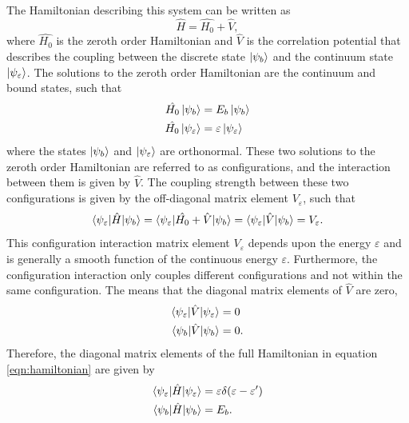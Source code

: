 The Hamiltonian describing this system can  be written as
\begin{equation}
\label{eqn:hamiltonian}
	\hat{H} = \hat{H_0} + \hat{V},
\end{equation}
where $\hat{H_0}$ is the zeroth order Hamiltonian and $\hat{V}$ is the correlation potential that describes the coupling between the discrete state $\ket{\psi_b}$ and the continuum state $\ket{\psi_\varepsilon}$.  The solutions to the zeroth order Hamiltonian are the continuum and bound states, such that 
\begin{align}
\label{eqn:configurations_hamiltonian}
	\hat{H_0}\ket{\psi_b} &= E_b\ket{\psi_b}\\
	\hat{H_0}\ket{\psi_\varepsilon} &= \varepsilon\ket{\psi_\varepsilon}
\end{align}
where the states $\ket{\psi_b}$ and $\ket{\psi_\varepsilon}$ are orthonormal.  These two solutions to the zeroth order Hamiltonian are referred to as configurations, and the interaction between them is given by $\hat{V}$. The coupling strength between these two configurations is given by the off-diagonal matrix element $V_\varepsilon$, such that
\begin{equation}
\label{eqn:coupling_matrix_element}
	\braket{\psi_\varepsilon|\hat{H}|\psi_b} = \braket{\psi_\varepsilon|\hat{H_0}+\hat{V}|\psi_b} = \braket{\psi_\varepsilon|\hat{V}|\psi_b} = V_\varepsilon.
\end{equation}  
This configuration interaction matrix element $V_\varepsilon$ depends upon the energy $\varepsilon$ and is generally a smooth function of the continuous energy $\varepsilon$.  Furthermore, the configuration interaction only couples different configurations and not within the same configuration.  The means that the diagonal matrix elements of $\hat{V}$ are zero,
\begin{align}
\label{eqn:config_int_diagonal}
	\braket{\psi_\varepsilon|\hat{V}|\psi_\varepsilon} &=0\\
	\braket{\psi_b|\hat{V}|\psi_b} &=0.
\end{align}
Therefore, the diagonal matrix elements of the full Hamiltonian in equation \ref{eqn:hamiltonian} are given by
\begin{align}
	\braket{\psi_\varepsilon|\hat{H}|\psi_\varepsilon} &= \varepsilon\delta(\varepsilon-\varepsilon')\\
	\braket{\psi_b|\hat{H}|\psi_b} &= E_b. 
\end{align}


